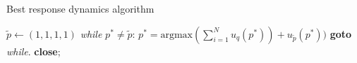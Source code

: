 \begin{algorithm}
    \caption{Best response dynamics algorithm}\label{algo:best_response_dynamics}
    \begin{algorithmic}[1]
    \State $\tilde{p} \gets (1, 1, 1, 1)$
    \BState \emph{while} $p^* \neq \tilde{p}$:
    \State $p^* = \text{argmax}(\sum\limits_{i=1} ^ N  u_q(p^*)) + u_{\tilde{p}}(p^*))$
    \State \textbf{goto} \emph{while}.
    \State \textbf{close};
    \EndProcedure
    \end{algorithmic}
\end{algorithm}

